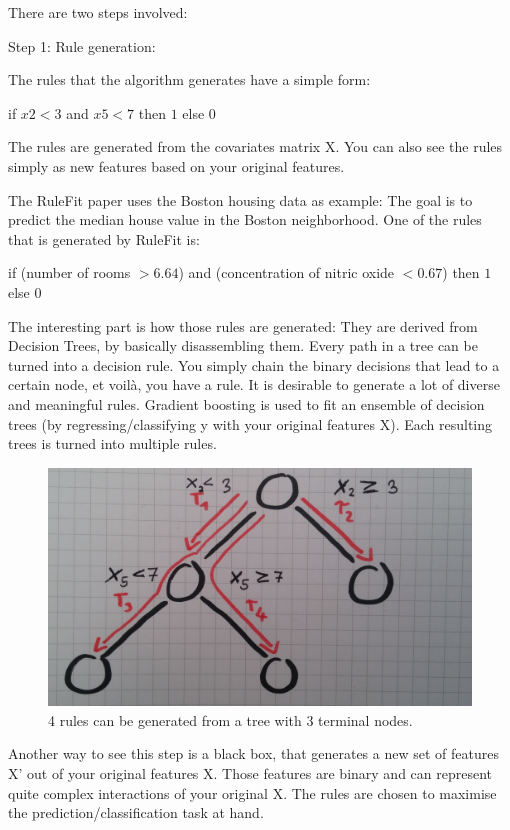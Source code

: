 \documentclass[12pt,]{krantz}
\theoremstyle{definition}
\theoremstyle{definition}
\theoremstyle{definition}
\theoremstyle{remark}
\begin{document}
There are two steps involved:

Step 1: Rule generation:

The rules that the algorithm generates have a simple form:

if \(x2 < 3\) and \(x5 < 7\) then \(1\) else \(0\)

The rules are generated from the covariates matrix X. You can also see
the rules simply as new features based on your original features.

The RuleFit paper uses the Boston housing data as example: The goal is
to predict the median house value in the Boston neighborhood. One of the
rules that is generated by RuleFit is:

if (number of rooms \(> 6.64\)) and (concentration of nitric oxide
\(< 0.67\)) then \(1\) else \(0\)

The interesting part is how those rules are generated: They are derived
from Decision Trees, by basically disassembling them. Every path in a
tree can be turned into a decision rule. You simply chain the binary
decisions that lead to a certain node, et voilà, you have a rule. It is
desirable to generate a lot of diverse and meaningful rules. Gradient
boosting is used to fit an ensemble of decision trees (by
regressing/classifying y with your original features X). Each resulting
trees is turned into multiple rules.

\begin{figure}
\includegraphics[width=0.8\linewidth]{images/rulefit} \caption{4 rules can be generated from a tree with 3 terminal nodes.}\label{fig:rulefit}
\end{figure}

Another way to see this step is a black box, that generates a new set of
features X' out of your original features X. Those features are binary
and can represent quite complex interactions of your original X. The
rules are chosen to maximise the prediction/classification task at hand.
\end{document}
